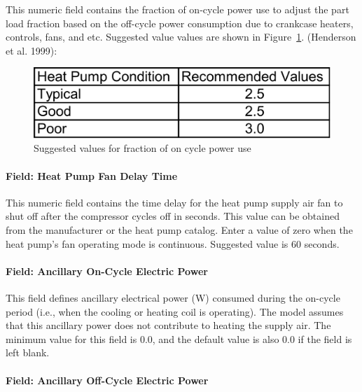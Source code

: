 This numeric field contains the fraction of on-cycle power use to adjust the part load fraction based on the off-cycle power consumption due to crankcase heaters, controls, fans, and etc. Suggested value values are shown in Figure~\ref{fig:suggested-values-for-fraction-of-on-cycle-power-use}. (Henderson et al. 1999):

\begin{figure}[htbp]
\centering
\includegraphics{media/image297.png}
\caption{Suggested values for fraction of on cycle power use \protect \label{fig:suggested-values-for-fraction-of-on-cycle-power-use}}
\end{figure}

\paragraph{Field: Heat Pump Fan Delay Time}\label{field-heat-pump-fan-delay-time-000}

This numeric field contains the time delay for the heat pump supply air fan to shut off after the compressor cycles off in seconds. This value can be obtained from the manufacturer or the heat pump catalog. Enter a value of zero when the heat pump's fan operating mode is continuous. Suggested value is 60 seconds.

\paragraph{Field: Ancillary On-Cycle Electric Power}\label{field-ancillary-on-cycle-electric-power}

This field defines ancillary electrical power (W) consumed during the on-cycle period (i.e., when the cooling or heating coil is operating). The model assumes that this ancillary power does not contribute to heating the supply air. The minimum value for this field is 0.0, and the default value is also 0.0 if the field is left blank.

\paragraph{Field: Ancillary Off-Cycle Electric Power}\label{field-ancillary-off-cycle-electric-power}

